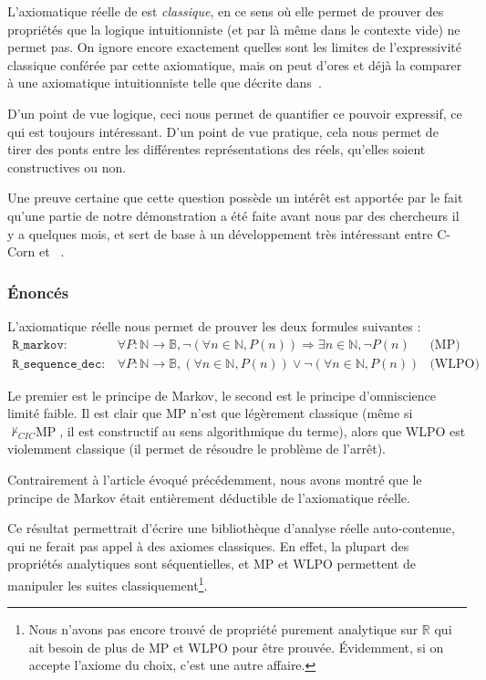 L'axiomatique réelle de \coq est \emph{classique}, en ce sens où elle permet de prouver des propriétés que la logique intuitionniste (et par là même \coq dans le contexte vide) ne permet pas. On ignore encore exactement quelles sont les limites de l'expressivité classique conférée par cette axiomatique, mais on peut d'ores et déjà la comparer à une axiomatique intuitionniste telle que décrite dans~\cite{Ciaffaglione00}.

D'un point de vue logique, ceci nous permet de quantifier ce pouvoir expressif, ce qui est toujours intéressant. D'un point de vue pratique, cela nous permet de tirer des ponts entre les différentes représen\-tations des réels, qu'elles soient constructives ou non.

Une preuve certaine que cette question possède un intérêt est apportée par le fait qu'une partie de notre démonstration a été faite avant nous par des chercheurs il y a quelques mois, et sert de base à un développement très intéressant entre C-Corn et \coq~\cite{DBLP08}.

\subsubsection{Énoncés}

L'axiomatique réelle nous permet de prouver les deux formules suivantes :
$$\begin{array}{llc}
\mathtt{R\_markov} :& \forall P : \mathbb{N}\rightarrow\mathbb{B}, \neg(\forall n\in\mathbb{N}, P(n)) \Rightarrow \exists n\in\mathbb{N}, \neg P(n) & \text{(MP)}\\
\mathtt{R\_sequence\_dec} :& \forall P : \mathbb{N}\rightarrow\mathbb{B}, (\forall n\in\mathbb{N}, P(n)) \vee \neg(\forall n\in\mathbb{N}, P(n)) & \text{(WLPO)}
\end{array}$$

Le premier est le principe de Markov, le second est le principe d'omniscience limité faible. Il est clair que MP n'est que légèrement classique (même si $\not\vdash_{CIC}\text{MP}$, il est constructif au sens algorithmique du terme), alors que WLPO est violemment classique (il permet de résoudre le problème de l'arrêt).

Contrairement à l'article évoqué précédemment, nous avons montré que le principe de Markov était entièrement déductible de l'axiomatique réelle.

Ce résultat permettrait d'écrire une bibliothèque d'analyse réelle auto-contenue, qui ne ferait pas appel à des axiomes classiques. En effet, la plupart des propriétés analytiques sont séquentielles, et MP et WLPO permettent de manipuler les suites classiquement\footnote{Nous n'avons pas encore trouvé de propriété purement analytique sur $\mathbb{R}$ qui ait besoin de plus de MP et WLPO pour être prouvée. Évidemment, si on accepte l'axiome du choix, c'est une autre affaire.}.


